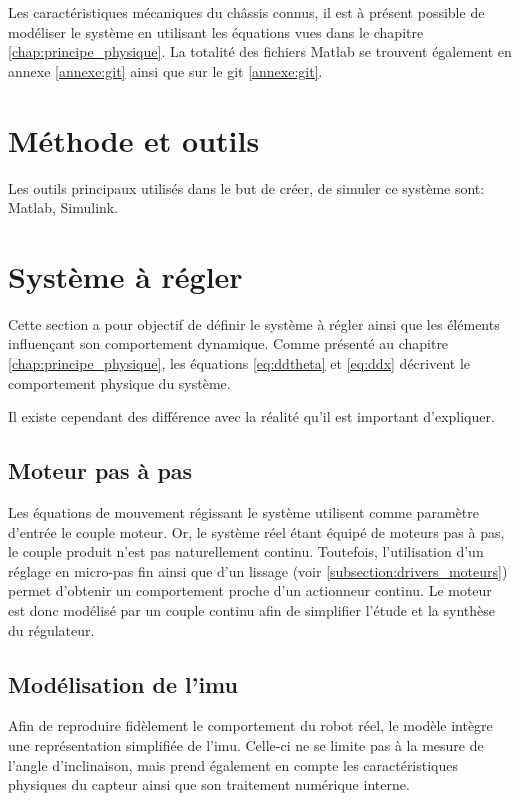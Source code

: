 
Les caractéristiques mécaniques du châssis connus, il est à présent possible de modéliser le système en utilisant les équations vues dans le chapitre \ref{chap:principe_physique}.
La totalité des fichiers Matlab se trouvent également en annexe \ref{annexe:git} ainsi que sur le git \ref{annexe:git}.

\section{Méthode et outils}
Les outils principaux utilisés dans le but de créer, de simuler ce système sont: Matlab, Simulink.
\section{Système à régler}

Cette section a pour objectif de définir le système à régler ainsi que les éléments influençant son comportement dynamique.
Comme présenté au chapitre \ref{chap:principe_physique}, les équations \ref{eq:ddtheta} et \ref{eq:ddx} décrivent le comportement physique du système.

Il existe cependant des différence avec la réalité qu'il est important d'expliquer.

\subsection{Moteur pas à pas}

Les équations de mouvement régissant le système utilisent comme paramètre d'entrée le couple moteur. Or, le système réel étant équipé de moteurs pas à pas, le couple produit n'est pas naturellement continu. Toutefois, l'utilisation d'un réglage en micro-pas fin ainsi que d'un lissage (voir \ref{subsection:drivers_moteurs}) permet d'obtenir un comportement proche d'un actionneur continu. Le moteur est donc modélisé par un couple continu afin de simplifier l'étude et la synthèse du régulateur.
\subsection{Modélisation de l'\acrshort{imu}}


Afin de reproduire fidèlement le comportement du robot réel, le modèle intègre une représentation simplifiée de l'\acrshort{imu}. Celle-ci ne se limite pas à la mesure de l'angle d'inclinaison, mais prend également en compte les caractéristiques physiques du capteur ainsi que son traitement numérique interne.

